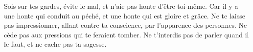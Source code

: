 Sois sur tes gardes, évite le mal, et n’aie pas honte d’être toi-même.
	Car il y a une honte qui conduit au péché, et une honte qui est gloire et grâce.
Ne te laisse pas impressionner, allant contre ta conscience,
	par l’apparence des personnes.
	Ne cède pas aux pressions qui te feraient tomber.
Ne t’interdis pas de parler quand il le faut, et ne cache pas ta sagesse.
